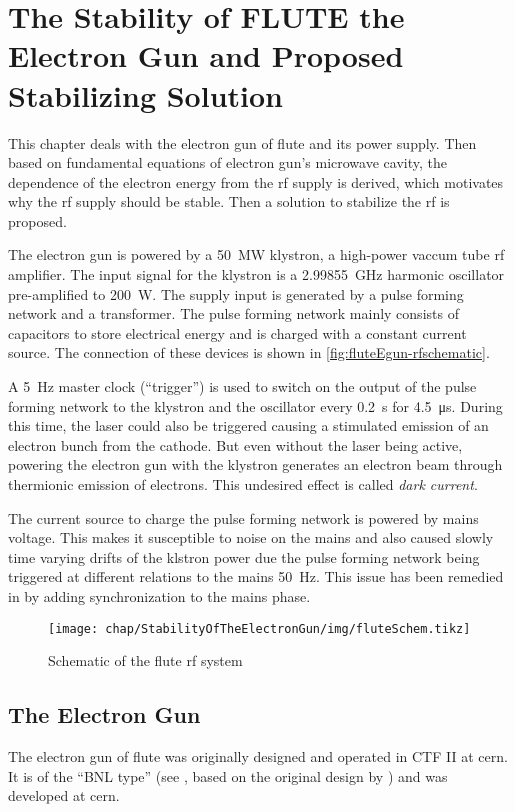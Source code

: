 \chapter{The Stability of FLUTE the Electron Gun and Proposed Stabilizing Solution}
This chapter deals with the electron gun of \gls{flute} and its power supply. Then based on fundamental equations of electron gun's microwave cavity, the dependence of the electron energy from the \gls{rf} supply is derived, which motivates why the \gls{rf} supply should be stable. Then a solution to stabilize the \gls{rf} is proposed.

The electron gun is powered by a \SI{50}{\MW} klystron, a high-power vaccum tube \gls{rf} amplifier. The input signal for the klystron is a \SI{2.99855}{\GHz} harmonic oscillator pre-amplified to \SI{200}{\watt}. The supply input is generated by a pulse forming network and a transformer. The pulse forming network mainly consists of capacitors to store electrical energy and is charged with a constant current source. The connection of these devices is shown in \autoref{fig:fluteEgun-rfschematic}.

A \SI{5}{\hertz} master clock (``trigger'') is used to switch on the output of the pulse forming network to the klystron and the oscillator every \SI{0.2}{\second} for \SI{4.5}{\micro\second}. During this time, the laser could also be triggered causing a stimulated emission of an electron bunch from the cathode. But even without the laser being active, powering the electron gun with the klystron generates an electron beam through thermionic emission of electrons. This undesired effect is called \textit{dark current}.

The current source to charge the pulse forming network is powered by mains voltage. This makes it susceptible to noise on the mains and also caused slowly time varying drifts of the klstron power due the pulse forming network being triggered at different relations to the mains \SI{50}{\hertz}. This issue has been remedied in \cite{Nasse2019} by adding synchronization to the mains phase.

\begin{figure}[tb]
	\centering
	\texttt{[image: chap/StabilityOfTheElectronGun/img/fluteSchem.tikz]}
	\caption{Schematic of the \gls{flute} \gls{rf} system}
	\label{fig:fluteEgun-rfschematic}
\end{figure}

\section{The Electron Gun}
The electron gun of \gls{flute} was originally designed and operated in CTF II at \gls{cern}. \cite{Schuh2014}
It is of the ``BNL type'' (see \cite{Batchelor1988}, based on the original design by \cite{fraser1987}) and was  developed at \gls{cern}. \cite{Bossart:288412}

